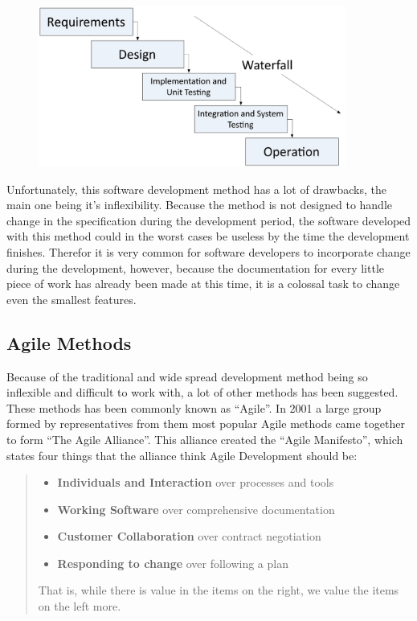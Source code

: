 \begin{figure}[H]
	\centering
		\includegraphics[width=0.90\textwidth]{input/implementation/development/waterfall.pdf}
	\label{fig:WaterfallPic}
\end{figure}

Unfortunately, this software development method has a lot of drawbacks, the main one being it's inflexibility. Because the method is not designed to handle change in the specification during the development period, the software developed with this method could in the worst cases be useless by the time the development finishes. Therefor it is very common for software developers to incorporate change during the development, however, because the documentation for every little piece of work has already been made at this time, it is a colossal task to change even the smallest features. 

\subsection{Agile Methods}

Because of the traditional and wide spread development method being so inflexible and difficult to work with, a lot of other methods has been suggested. These methods has been commonly known as ``Agile''. In 2001 a large group formed by representatives from them most popular Agile methods came together to form ``The Agile Alliance''. This alliance created the ``Agile Manifesto'', which states four things that the alliance think Agile Development should be:

\begin{quotation}
	\begin{itemize}
	\item \textbf{Individuals and Interaction} over processes and tools
	\item \textbf{Working Software} over comprehensive documentation
	\item \textbf{Customer Collaboration} over contract negotiation
	\item \textbf{Responding to change} over following a plan
\end{itemize}

That is, while there is value in the items on the right, we value the items on the left more.
\end{quotation}

